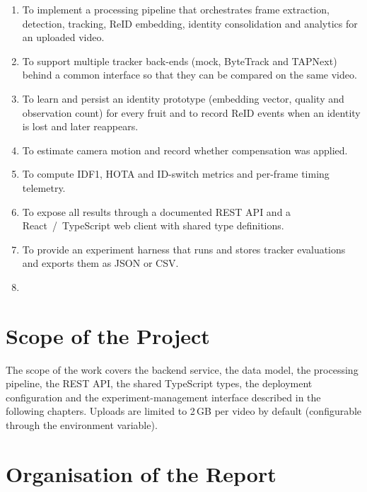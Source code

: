 \begin{enumerate}
  \item To implement a processing pipeline that orchestrates frame extraction, detection, tracking, ReID embedding, identity consolidation and analytics for an uploaded video.
  \item To support multiple tracker back-ends (mock, ByteTrack and TAPNext) behind a common interface so that they can be compared on the same video.
  \item To learn and persist an identity prototype (embedding vector, quality and observation count) for every fruit and to record ReID events when an identity is lost and later reappears.
  \item To estimate camera motion and record whether compensation was applied.
  \item To compute IDF1, HOTA and ID-switch metrics and per-frame timing telemetry.
  \item To expose all results through a documented REST API and a React~/~TypeScript web client with shared type definitions.
  \item To provide an experiment harness that runs and stores tracker evaluations and exports them as JSON or CSV.
  \item {}
\end{enumerate}

\section{Scope of the Project}

The scope of the work covers the backend service, the data model, the processing pipeline, the REST API, the shared TypeScript types, the deployment configuration and the experiment-management interface described in the following chapters. Uploads are limited to 2\,GB per video by default (configurable through the  environment variable).


\section{Organisation of the Report}

